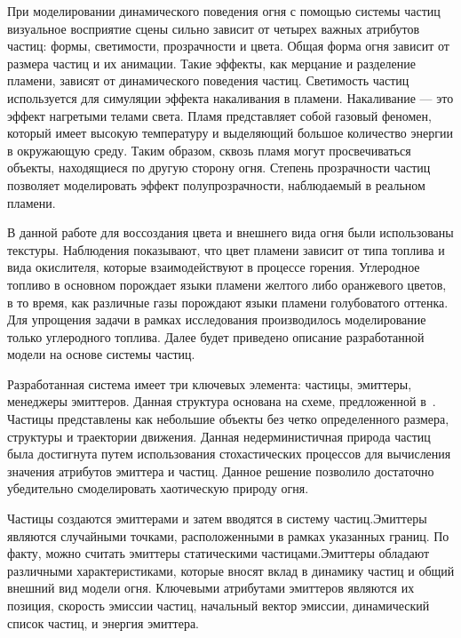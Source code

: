 При моделировании динамического поведения огня с помощью системы частиц
визуальное восприятие сцены сильно зависит от четырех важных атрибутов частиц:
формы, светимости, прозрачности и цвета. Общая форма огня зависит от размера
частиц и их анимации. Такие эффекты, как мерцание и разделение пламени, зависят
от динамического поведения частиц. Светимость частиц используется для симуляции
эффекта накаливания в пламени. Накаливание --- это эффект нагретыми телами
света. Пламя представляет собой газовый феномен, который имеет высокую
температуру и выделяющий большое количество энергии в окружающую среду. Таким
образом, сквозь пламя могут просвечиваться объекты, находящиеся по другую
сторону огня. Степень прозрачности частиц позволяет моделировать эффект
полупрозрачности, наблюдаемый в реальном пламени.

В данной работе для воссоздания цвета и внешнего вида огня были использованы
текстуры. Наблюдения показывают, что цвет пламени зависит от типа топлива и вида
окислителя, которые взаимодействуют в процессе горения. Углеродное топливо в
основном порождает языки пламени желтого либо оранжевого цветов, в то время, как
различные газы порождают языки пламени голубоватого оттенка. Для упрощения
задачи в рамках исследования производилось моделирование только углеродного
топлива. Далее будет приведено описание разработанной модели на основе системы
частиц.

Разработанная система имеет три ключевых элемента: частицы, эмиттеры, менеджеры
эмиттеров. Данная структура основана на схеме, предложенной
в~\cite{Somasekaran2005UsingPS}. Частицы представлены как небольшие объекты без
четко определенного размера, структуры и траектории движения. Данная
недерминистичная природа частиц была достигнута путем использования
стохастических процессов для вычисления значения атрибутов эмиттера и частиц.
Данное решение позволило достаточно убедительно смоделировать хаотическую
природу огня.

Частицы создаются эмиттерами и затем вводятся в систему частиц.\break{}Эмиттеры
являются случайными точками, расположенными в рамках указанных границ. По факту,
можно считать эмиттеры статическими частицами.\break{}Эмиттеры обладают
различными характеристиками, которые вносят вклад в динамику частиц и общий
внешний вид модели огня. Ключевыми атрибутами эмиттеров являются их позиция,
скорость эмиссии частиц, начальный вектор эмиссии, динамический список частиц, и
энергия эмиттера.

